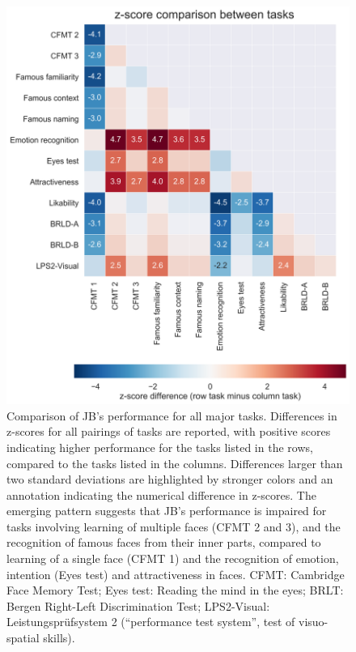 \documentclass[fleqn,10pt]{SelfArx} %
\begin{document}
\begin{figure}[htbp]
	
	\renewcommand{\familydefault}{\sfdefault}\normalfont
	\centering
	\includegraphics[width=\columnwidth]{../reports/figures/overview_heatmap.png}
	\vspace*{-3mm}
 		\caption{Comparison of JB's performance for all major tasks. Differences in z-scores for all pairings of tasks are reported, with positive scores indicating higher performance for the tasks listed in the rows, compared to the tasks listed in the columns. Differences larger than two standard deviations are highlighted by stronger colors and an annotation indicating the numerical difference in z-scores. The emerging pattern suggests that JB’s performance is impaired for tasks involving learning of multiple faces (CFMT 2 and 3), and the recognition of famous faces from their inner parts, compared to learning of a single face (CFMT 1) and the recognition of emotion, intention (Eyes test) and attractiveness in faces. CFMT: Cambridge Face Memory Test; Eyes test: Reading the mind in the eyes; BRLT: Bergen Right-Left Discrimination Test; LPS2-Visual: Leistungsprüfsystem 2 (“performance test system”, test of visuo-spatial skills).}%
 		\label{fig:heat}
	
\end{figure}
\end{document}
